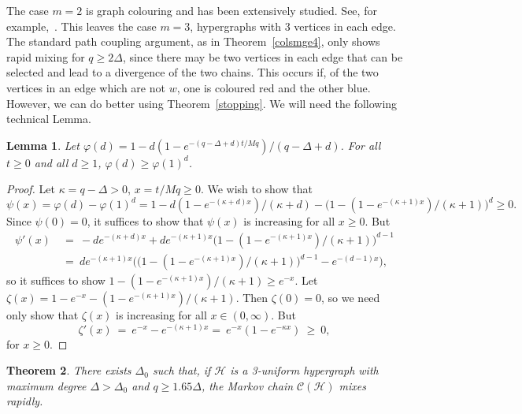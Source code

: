 \documentclass[11pt]{article}
\newtheorem{thm}{Theorem}[section]
\newtheorem{lem}[thm]{Lemma}
\theoremstyle{definition}
\theoremstyle{remark}
\newcommand{\C}{\mathcal{C}}
\newcommand{\CH}{\mathcal{H}}
\begin{document}
The case $m=2$ is graph colouring and has been extensively studied. See,
for example,~\cite{DFHV04}. This leaves the case $m=3$, hypergraphs with 3
vertices in each edge. The standard path coupling argument, as in
Theorem~\ref{colsmge4}, only shows rapid mixing for $q\geq 2\Delta$, since
there may be two vertices in each edge that can be selected and lead to a
divergence of the two chains. This occurs if, of the two vertices in an
edge which are not $w$, one is coloured red and the other blue. However, we
can do better using Theorem~\ref{stopping}. We will need the following
technical Lemma.
\begin{lem}\label{dws}
Let $ \varphi(d)=1- d(1-e^{-(q-\Delta+d)t/Mq})/(q-\Delta+d)$. For
all $t\geq 0$ and all $d\geq 1$, $\varphi(d)\geq\varphi(1)^d$.
\end{lem}
\begin{proof}
Let $\kappa=q-\Delta> 0$,
$x=t/Mq\geq 0$.
We wish to show that\vspace{-1.5ex}%
\[ \psi(x)= \varphi(d)-\varphi(1)^d=
1- d(1-e^{-(\kappa+d)x})/(\kappa+d) - \big(1-
(1-e^{-(\kappa+1)x})/(\kappa+1)\big)^d \geq 0.\]%
Since $\psi(0)=0$, it suffices to show that $\psi(x)$ is
increasing for all $x \geq 0$. But
\begin{align*}
    \psi'(x)\ &=\ -de^{-(\kappa+d)x}+de^{-(\kappa+1)x}\big(1-
    (1-e^{-(\kappa+1)x})/(\kappa+1)\big)^{d-1}\\[1ex]
    &=\ de^{-(\kappa+1)x}\big(\big(1-(1-e^{-(\kappa+1)x})/(\kappa+1)\big)^{d-1}
    -e^{-(d-1)x}\big),
\end{align*}
so it suffices to show $1-(1-e^{-(\kappa+1)x})/(\kappa+1) \geq
e^{-x}$. Let $\zeta(x)=1-e^{-x}-(1-e^{-(\kappa+1)x})/(\kappa+1)$.
Then $\zeta(0)=0$, so we need only show that $\zeta(x)$ is
increasing for all $x\in(0,\infty)$. But
\begin{equation*}
    \zeta'(x)\ =\ e^{-x}-e^{-(\kappa+1)x}
    =\ e^{-x}(1-e^{-\kappa x})\ \geq\ 0,
\end{equation*}
for $x \geq 0$.
\end{proof}\vspace{0ex}

\begin{thm}\label{colouring}
There exists $\Delta_0$ such that, if $\CH$ is a 3-uniform hypergraph with
maximum degree $\Delta>\Delta_0$ and $q \geq 1.65 \Delta$, the Markov chain
$\C(\CH)$ mixes rapidly.
\end{thm}
\end{document}
